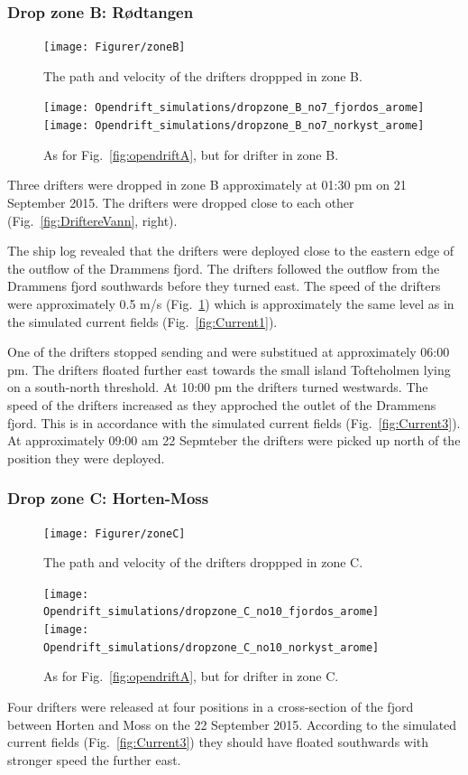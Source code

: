 \documentclass[12pt,a4paper,english]{article}
\begin{document}
\subsubsection{Drop zone B: R\o dtangen}
%
\begin{figure}[ht]
\centerline{
\texttt{[image: Figurer/zoneB]}}
\caption{\small
The path and velocity of the drifters droppped in zone B.}
\label{fig:ZoneB}
\end{figure}
%
\begin{figure}[ht]
\centerline{
\texttt{[image: Opendrift\_simulations/dropzone\_B\_no7\_fjordos\_arome]}
\texttt{[image: Opendrift\_simulations/dropzone\_B\_no7\_norkyst\_arome]}
}
\caption{\small
As for Fig.~\ref{fig:opendriftA}, but for drifter in zone B.
}
\label{fig:opendriftB}
\end{figure}
%
Three drifters were dropped in zone B approximately at 01:30 pm on 21 September 2015. The drifters were dropped close to each other (Fig.~\ref{fig:DriftereVann}, right).

The ship log revealed that the drifters were deployed close to the eastern edge of the outflow of the Drammens fjord. The drifters followed the outflow from the Drammens fjord southwards before they turned east. The speed of the drifters were approximately 0.5 m/s (Fig.~\ref{fig:ZoneB}) which is approximately the same level as in the simulated current fields (Fig.~\ref{fig:Current1}). 

One of the drifters stopped sending and were substitued at approximately 06:00 pm. The drifters floated further east towards the small island Tofteholmen lying on a south-north threshold. At 10:00 pm the drifters turned westwards. The speed of the drifters increased as they approched the outlet of the Drammens fjord. This is in accordance with the simulated current fields (Fig.~\ref{fig:Current3}). At approximately 09:00 am 22 Sepmteber the drifters were picked up north of the position they were deployed.

\subsubsection{Drop zone C: Horten-Moss}
%
\begin{figure}[ht]
\centerline{
\texttt{[image: Figurer/zoneC]}}
\caption{\small
The path and velocity of the drifters droppped in zone C.}
\label{fig:ZoneC}
\end{figure}
%
\begin{figure}[ht]
\centerline{
\texttt{[image: Opendrift\_simulations/dropzone\_C\_no10\_fjordos\_arome]}
\texttt{[image: Opendrift\_simulations/dropzone\_C\_no10\_norkyst\_arome]}
}
\caption{\small
As for Fig.~\ref{fig:opendriftA}, but for drifter in zone C.
}
\label{fig:opendriftC}
\end{figure}
%
Four drifters were released at four positions in a cross-section of the fjord between Horten and Moss on the 22 September 2015. According to the simulated current fields (Fig.~\ref{fig:Current3}) they should have floated southwards with stronger speed the further east. 
\end{document}
